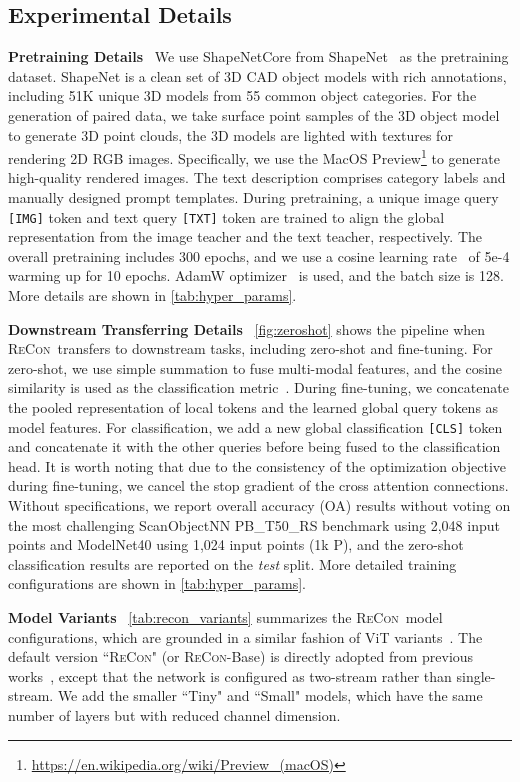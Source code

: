 \documentclass{article}
\theoremstyle{plain}
\theoremstyle{definition}
\theoremstyle{remark}
\def\recon{{\scshape ReCon}}
\begin{document}
\subsection{Experimental Details}
\textbf{Pretraining Details}~
We use ShapeNetCore from ShapeNet~\citep{ShapeNet15} as the pretraining dataset. ShapeNet is a clean set of 3D CAD object models with rich annotations, including 51K unique 3D models from 55 common object categories. 
For the generation of paired data, we take surface point samples of the 3D object model to generate 3D point clouds, the 3D models are lighted with textures for rendering 2D RGB images. 
Specifically, we use the MacOS Preview\footnote{\url{https://en.wikipedia.org/wiki/Preview_(macOS)}} to generate high-quality rendered images. 
The text description comprises category labels and manually designed prompt templates.
During pretraining, a unique image query \texttt{[IMG]} token and text query \texttt{[TXT]} token are trained to align the global representation from the image teacher and the text teacher, respectively. 
The overall pretraining includes 300 epochs, and we use a cosine learning rate~\citep{CosineLRSGDR} of 5e-4 warming up for 10 epochs. AdamW optimizer~\citep{AdamW19} is used, and the batch size is 128.
More details are shown in \cref{tab:hyper_params}.

\textbf{Downstream Transferring Details}~
\cref{fig:zeroshot} shows the pipeline when \recon\ transfers to downstream tasks, including zero-shot and fine-tuning. For zero-shot, we use simple summation to fuse multi-modal features, and the cosine similarity is used as the classification metric~\citep{CLIP}. 
During fine-tuning, we concatenate the pooled representation of local tokens and the learned global query tokens as model features.
For classification, we add a new global classification \texttt{[CLS]} token and concatenate it with the other queries before being fused to the classification head.
It is worth noting that due to the consistency of the optimization objective during fine-tuning, we cancel the stop gradient of the cross attention connections.
Without specifications, we report overall accuracy (OA) results without voting on the most challenging ScanObjectNN PB\_T50\_RS benchmark using 2,048 input points and ModelNet40 using 1,024 input points (1k P), and the zero-shot classification results are reported on the \textit{test} split.
More detailed training configurations are shown in \cref{tab:hyper_params}.

\textbf{Model Variants}~
\cref{tab:recon_variants} summarizes the \recon\ model configurations, which are grounded in a similar fashion of ViT variants~\citep{ViT}.
The default version ``\recon" (or \recon-Base) is directly adopted from previous works~\citep{PointMAE,ACT23}, except that the network is configured as two-stream rather than single-stream. We add the smaller ``Tiny" and ``Small" models, which have the same number of layers but with reduced channel dimension.
\vspace{-8pt}
\end{document}
